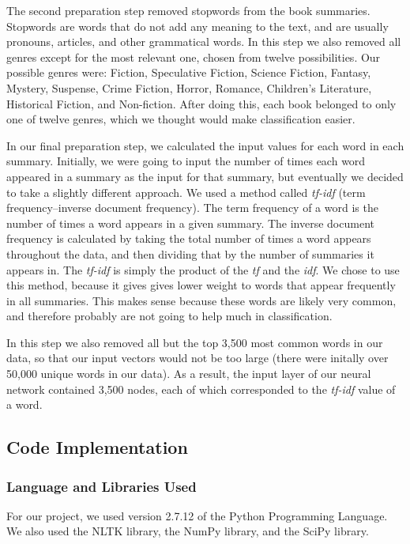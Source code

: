 \documentclass[11pt,letterpaper]{article}
\begin{document}
The second preparation step removed stopwords from the book summaries. Stopwords are words that do not add any meaning to the text, and are usually pronouns, articles, and other grammatical words. In this step we also removed all genres except for the most relevant one, chosen from twelve possibilities. Our possible genres were: Fiction, Speculative Fiction, Science Fiction, Fantasy, Mystery, Suspense, Crime Fiction, Horror, Romance, Children's Literature, Historical Fiction, and Non-fiction. After doing this, each book belonged to only one of twelve genres, which we thought would make classification easier.

In our final preparation step, we calculated the input values for each word in each summary. Initially, we were going to input the number of times each word appeared in a summary as the input for that summary, but eventually we decided to take a slightly different approach. We used a method called \emph{tf-idf} (term frequency--inverse document frequency). The term frequency of a word is the number of times a word appears in a given summary. The inverse document frequency is calculated by taking the total number of times a word appears throughout the data, and then dividing that by the number of summaries it appears in. The \emph{tf-idf} is simply the product of the \emph{tf} and the \emph{idf}. We chose to use this method, because it gives gives lower weight to words that appear frequently in all summaries. This makes sense because these words are likely very common, and therefore probably are not going to help much in classification.

In this step we also removed all but the top 3,500 most common words in our data, so that our input vectors would not be too large (there were initally over 50,000 unique words in our data). As a result, the input layer of our neural network contained 3,500 nodes, each of which corresponded to the \emph{tf-idf} value of a word.

\subsection{Code Implementation}
\subsubsection{Language and Libraries Used}
For our project, we used version 2.7.12 of the Python Programming Language. We also used the NLTK library, the NumPy library, and the SciPy library.
\end{document}
